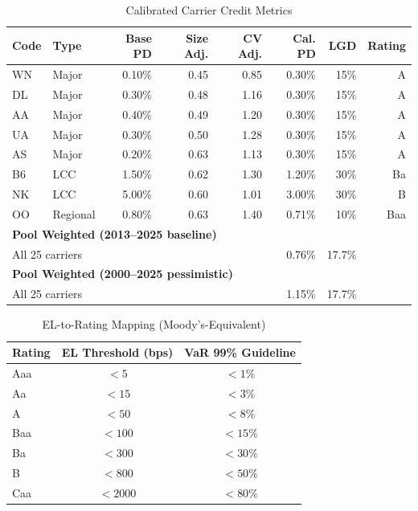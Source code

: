 \documentclass[12pt,a4paper]{article}
\begin{document}
\begin{table}[H]
\centering
\caption{Calibrated Carrier Credit Metrics}
\label{tab:credit_results}
\begin{tabular}{llrrrrrr}
\toprule
\textbf{Code} & \textbf{Type} & \textbf{Base PD} & \textbf{Size Adj.} & \textbf{CV Adj.} & \textbf{Cal. PD} & \textbf{LGD} & \textbf{Rating} \\
\midrule
WN & Major & 0.10\% & 0.45 & 0.85 & 0.30\% & 15\% & A \\
DL & Major & 0.30\% & 0.48 & 1.16 & 0.30\% & 15\% & A \\
AA & Major & 0.40\% & 0.49 & 1.20 & 0.30\% & 15\% & A \\
UA & Major & 0.30\% & 0.50 & 1.28 & 0.30\% & 15\% & A \\
AS & Major & 0.20\% & 0.63 & 1.13 & 0.30\% & 15\% & A \\
B6 & LCC   & 1.50\% & 0.62 & 1.30 & 1.20\% & 30\% & Ba \\
NK & LCC   & 5.00\% & 0.60 & 1.01 & 3.00\% & 30\% & B \\
OO & Regional & 0.80\% & 0.63 & 1.40 & 0.71\% & 10\% & Baa \\
\midrule
\multicolumn{7}{l}{\textbf{Pool Weighted (2013--2025 baseline)}} \\
\multicolumn{2}{l}{All 25 carriers} & & & & 0.76\% & 17.7\% & \\
\multicolumn{7}{l}{\textbf{Pool Weighted (2000--2025 pessimistic)}} \\
\multicolumn{2}{l}{All 25 carriers} & & & & 1.15\% & 17.7\% & \\
\bottomrule
\end{tabular}
\end{table}

\begin{table}[H]
\centering
\caption{EL-to-Rating Mapping (Moody's-Equivalent)}
\label{tab:rating_map}
\begin{tabular}{lcc}
\toprule
\textbf{Rating} & \textbf{EL Threshold (bps)} & \textbf{VaR 99\% Guideline} \\
\midrule
Aaa & $< 5$   & $< 1\%$ \\
Aa  & $< 15$  & $< 3\%$ \\
A   & $< 50$  & $< 8\%$ \\
Baa & $< 100$ & $< 15\%$ \\
Ba  & $< 300$ & $< 30\%$ \\
B   & $< 800$ & $< 50\%$ \\
Caa & $< 2000$& $< 80\%$ \\
\bottomrule
\end{tabular}
\end{table}
\end{document}
